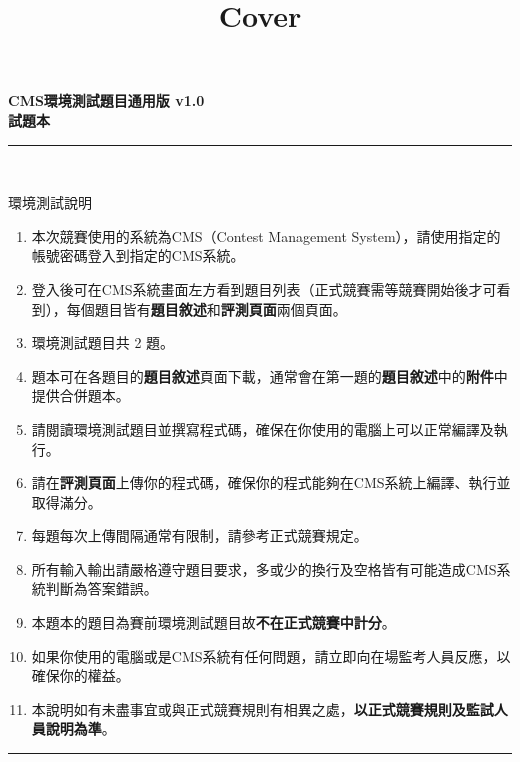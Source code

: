 \documentclass[a4paper]{article}
\title{Cover}
\begin{document}
\begin{center}
\textbf{\huge CMS環境測試題目通用版 v1.0}\\
\vspace{5mm}
\textbf{\huge 試題本}\\
\vspace{10mm}
\rule{17cm}{2pt}\\
\vspace{5mm}

\huge 環境測試說明\\
\end{center}

\fontsize{14pt}{20pt}\selectfont
\begin{enumerate}
    \setlength\itemsep{0.5pt}
    \item 本次競賽使用的系統為CMS（Contest Management System），請使用指定的帳號密碼登入到指定的CMS系統。
    \item 登入後可在CMS系統畫面左方看到題目列表（正式競賽需等競賽開始後才可看到），每個題目皆有\textbf{題目敘述}和\textbf{評測頁面}兩個頁面。
    \item 環境測試題目共 2 題。
    \item 題本可在各題目的\textbf{題目敘述}頁面下載，通常會在第一題的\textbf{題目敘述}中的\textbf{附件}中提供合併題本。
    \item 請閱讀環境測試題目並撰寫程式碼，確保在你使用的電腦上可以正常編譯及執行。
    \item 請在\textbf{評測頁面}上傳你的程式碼，確保你的程式能夠在CMS系統上編譯、執行並取得滿分。
    \item 每題每次上傳間隔通常有限制，請參考正式競賽規定。
    \item 所有輸入輸出請嚴格遵守題目要求，多或少的換行及空格皆有可能造成CMS系統判斷為答案錯誤。
    \item 本題本的題目為賽前環境測試題目故\textbf{不在正式競賽中計分}。
    \item 如果你使用的電腦或是CMS系統有任何問題，請立即向在場監考人員反應，以確保你的權益。
    \item 本說明如有未盡事宜或與正式競賽規則有相異之處，\textbf{以正式競賽規則及監試人員說明為準}。

\end{enumerate}

\begin{center}
\rule{17cm}{2pt}\\
\end{center}
\end{document}
